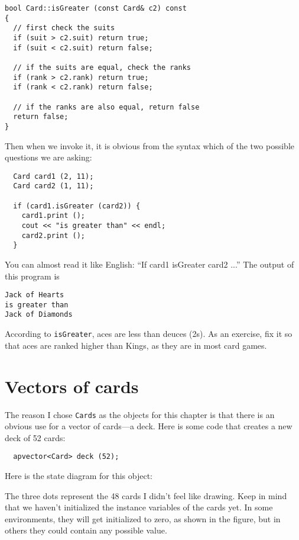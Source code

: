 \begin{verbatim}
bool Card::isGreater (const Card& c2) const
{
  // first check the suits
  if (suit > c2.suit) return true;
  if (suit < c2.suit) return false;

  // if the suits are equal, check the ranks
  if (rank > c2.rank) return true;
  if (rank < c2.rank) return false;

  // if the ranks are also equal, return false
  return false;
}
\end{verbatim}
%
Then when we invoke it, it is obvious from the syntax which
of the two possible questions we are asking:

\begin{verbatim}
  Card card1 (2, 11);
  Card card2 (1, 11);

  if (card1.isGreater (card2)) {
    card1.print ();
    cout << "is greater than" << endl;
    card2.print ();
  }
\end{verbatim}
%
You can almost read it like English: ``If card1 isGreater card2 ...''
The output of this program is

\begin{verbatim}
Jack of Hearts
is greater than
Jack of Diamonds
\end{verbatim}
%
According to {\tt isGreater}, aces are
less than deuces (2s).
As an exercise, fix it so that aces are ranked higher than Kings,
as they are in most card games.

\section{Vectors of cards}

The reason I chose {\tt Cards} as the objects for this chapter is that
there is an obvious use for a vector of cards---a deck.  Here is some
code that creates a new deck of 52 cards:

\begin{verbatim}
  apvector<Card> deck (52);
\end{verbatim}
%
Here is the state diagram for this object:


\vspace{0.1in}
\centerline{}
\vspace{0.1in}

The three dots represent the 48 cards I didn't feel like
drawing.  Keep in mind that we haven't initialized the instance
variables of the cards yet.  In some environments, they will get
initialized to zero, as shown in the figure, but in others they
could contain any possible value.


